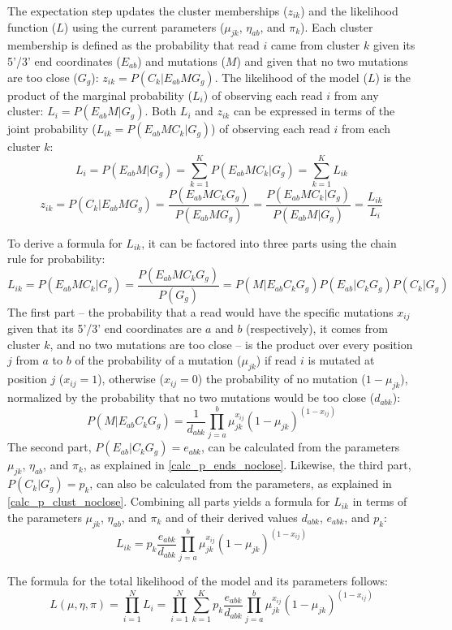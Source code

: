 \documentclass[main.tex]{subfiles}
\begin{document}
The expectation step updates the cluster memberships ($z_{ik}$) and the likelihood function ($L$) using the current parameters ($\mu_{jk}$, $\eta_{ab}$, and $\pi_k$).
Each cluster membership is defined as the probability that read $i$ came from cluster $k$ given its 5'/3' end coordinates ($E_{ab}$) and mutations ($M$) and given that no two mutations are too close ($G_g$): $z_{ik} = P(C_k | E_{ab} M G_g)$.
The likelihood of the model ($L$) is the product of the marginal probability ($L_i$) of observing each read $i$ from any cluster: $L_i = P(E_{ab} M | G_g)$.
Both $L_i$ and $z_{ik}$ can be expressed in terms of the joint probability ($L_{ik} = P(E_{ab} M C_k | G_g)$) of observing each read $i$ from each cluster $k$:
$$L_i = P(E_{ab} M | G_g) = \sum_{k=1}^K P(E_{ab} M C_k | G_g) = \sum_{k=1}^K L_{ik}$$
$$z_{ik} = P(C_k | E_{ab} M G_g) = \frac{P(E_{ab} M C_k G_g)}{P(E_{ab} M G_g)} = \frac{P(E_{ab} M C_k | G_g)}{P(E_{ab} M | G_g)} = \frac{L_{ik}}{L_i}$$

To derive a formula for $L_{ik}$, it can be factored into three parts using the chain rule for probability:
$$L_{ik} = P(E_{ab} M C_k | G_g) = \frac{P(E_{ab} M C_k G_g)}{P(G_g)} = P(M | E_{ab} C_k G_g) P(E_{ab} | C_k G_g) P(C_k | G_g)$$
The first part -- the probability that a read would have the specific mutations $x_{ij}$ given that its 5'/3' end coordinates are $a$ and $b$ (respectively), it comes from cluster $k$, and no two mutations are too close -- is the product over every position $j$ from $a$ to $b$ of the probability of a mutation ($\mu_{jk}$) if read $i$ is mutated at position $j$ ($x_{ij} = 1$), otherwise ($x_{ij} = 0$) the probability of no mutation ($1 - \mu_{jk}$), normalized by the probability that no two mutations would be too close ($d_{abk}$):
$$P(M | E_{ab} C_k G_g) = \frac{1}{d_{abk}} \prod_{j=a}^{b} \mu_{jk}^{x_{ij}} (1 - \mu_{jk})^{(1 - x_{ij})}$$
The second part, $P(E_{ab} | C_k G_g) = e_{abk}$, can be calculated from the parameters $\mu_{jk}$, $\eta_{ab}$, and $\pi_k$, as explained in \ref{calc_p_ends_noclose}.
Likewise, the third part, $P(C_k | G_g) = p_k$, can also be calculated from the parameters, as explained in \ref{calc_p_clust_noclose}.
Combining all parts yields a formula for $L_{ik}$ in terms of the parameters $\mu_{jk}$, $\eta_{ab}$, and $\pi_k$ and of their derived values $d_{abk}$, $e_{abk}$, and $p_k$:
$$L_{ik} = p_k \frac{e_{abk}}{d_{abk}} \prod_{j=a}^{b} \mu_{jk}^{x_{ij}} (1 - \mu_{jk})^{(1 - x_{ij})}$$

The formula for the total likelihood of the model and its parameters follows:
$$L(\mu, \eta, \pi) = \prod_{i=1}^{N} L_i = \prod_{i=1}^{N} \sum_{k=1}^{K} p_k \frac{e_{abk}}{d_{abk}} \prod_{j=a}^{b} \mu_{jk}^{x_{ij}} (1 - \mu_{jk})^{(1 - x_{ij})}$$
\end{document}
